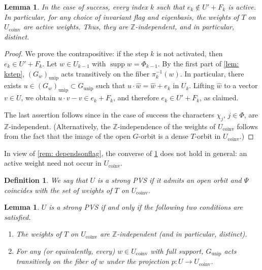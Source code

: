 \documentclass[12pt]{article}
\newtheorem{lemma}[theorem]{Lemma}
\newtheorem{definition}[theorem]{Definition}
\newcommand{\Z}{\mathbb{Z}}
\newcommand{\supp}{\operatorname{supp}}
\newcommand{\rad}[1]{#1_{\operatorname{unip}}}
\newcommand{\coinv}{\operatorname{coinv}}
\newcommand{\PVS}{PVS}
\begin{document}
\begin{lemma} \label{lem: coinvactive}
In the case of success, every index $k$ such that $e_k\notin U'+F_k$ is active.
In particular, for any choice of invariant flag and eigenbasis, the weights of $T$ on $U_{\coinv}$ are active weights.
Thus, they are $\Z$-independent, and in particular, distinct.
\end{lemma}

\begin{proof}
We prove the contrapositive: if the step $k$ is not activated, then $e_k\in U'+F_k$.
Let $w\in U_{k-1}$ with $\supp w=\Phi_{k-1}$.
By the first part of \cref{lem: kstep}, $\rad{(G_w)}$ acts transitively on the fiber $\pi_k^{-1}(w)$.
In particular, there exists $u\in\rad{(G_w)}\subset \rad{G}$ such that $u\cdot\hat w=\hat w+e_k$ in $U_k$.
Lifting $\hat w$ to a vector $v\in U$, we obtain $u\cdot v-v\in e_k+F_k$, and therefore $e_k\in U'+F_k$, as claimed.

The last assertion follows since in the case of success the characters $\chi_j$, $j\in\Phi$, are $\Z$-independent.
(Alternatively, the $\Z$-independence of the weights of $U_{\coinv}$ follows from the fact that the image of the
open $G$-orbit is a dense $T$-orbit in $U_{\coinv}$.)
\end{proof}

In view of \cref{rem: dependsonflag}, the converse of \cref{lem: coinvactive} does not hold in general: an active weight need not occur in $U_{\coinv}$.

\begin{definition} \label{def: strongPVS}
We say that $U$ is a strong {\PVS} if it admits an open orbit and $\Psi$ coincides with the set of weights of $T$ on $U_{\coinv}$. 
\end{definition}

\begin{lemma}
$U$ is a strong {\PVS} if and only if the following two conditions are satisfied.
\begin{enumerate}
\item The weights of $T$ on $U_{\coinv}$ are $\Z$-independent (and in particular, distinct).
\item For any (or equivalently, every) $w\in U_{\coinv}$ with full support,
$\rad{G}$ acts transitively on the fiber of $w$ under the projection $p:U\rightarrow U_{\coinv}$.
\end{enumerate}
\end{lemma}
\end{document}
